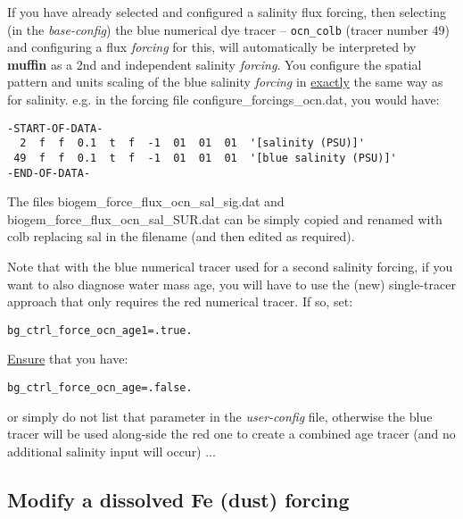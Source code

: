 \documentclass[11pt,fleqn]{book} %
\begin{document}
If you have already selected and configured a salinity flux forcing, then selecting (in the \textit{base-config}) the blue numerical dye tracer -- \texttt{ocn\_colb} (tracer number \(49\)) and configuring a flux \textit{forcing} for this, will automatically be interpreted by \textbf{muffin} as a 2nd and independent salinity \textit{forcing}. You configure the spatial pattern and units scaling of the blue salinity \textit{forcing} in \uline{exactly} the same way as for salinity. e.g. in the forcing file \textsf{\footnotesize configure\_forcings\_ocn.dat}, you would have:

\vspace{-2mm}\small\begin{verbatim}
-START-OF-DATA-
  2  f  f  0.1  t  f  -1  01  01  01  '[salinity (PSU)]'
 49  f  f  0.1  t  f  -1  01  01  01  '[blue salinity (PSU)]'
-END-OF-DATA-
\end{verbatim}\normalsize\vspace{-2mm}

The files \textsf{\footnotesize biogem\_force\_flux\_ocn\_sal\_sig.dat} and \textsf{\footnotesize biogem\_force\_flux\_ocn\_sal\_SUR.dat} can be simply copied and renamed with \textsf{\footnotesize colb} replacing \textsf{\footnotesize sal} in the filename (and then edited as required).

Note that with the blue numerical tracer used for a second salinity forcing, if you want to also diagnose water mass age, you will have to use the (new) single-tracer approach that only requires the red numerical tracer. If so, set:
\vspace{-2pt}\small\begin{verbatim}
bg_ctrl_force_ocn_age1=.true.
\end{verbatim}\normalsize\vspace{-2pt}
\uline{Ensure} that you have:
\vspace{-2pt}\small\begin{verbatim}
bg_ctrl_force_ocn_age=.false.
\end{verbatim}\normalsize\vspace{-2pt}
or simply do not list that parameter in the \textit{user-config} file, otherwise the blue tracer will be used along-side the red one to create a combined age tracer (and no additional salinity input will occur) ...

%
\newpage
\subsection*{Modify a dissolved Fe (dust) forcing}
\vspace{1mm}
\end{document}
